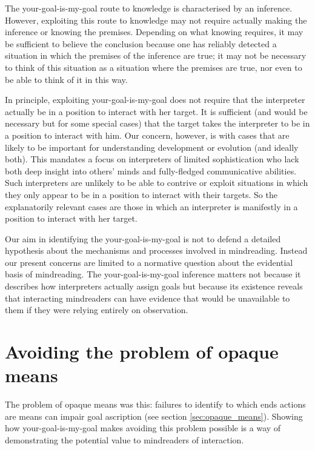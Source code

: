 \documentclass[14pt,a4paper]{extarticle}
\begin{document}
The your-goal-is-my-goal route to knowledge is characterised by an inference.  
However, exploiting this route to knowledge may not require actually making the inference or knowing the premises.  
Depending on what knowing requires,
it may be sufficient to believe the conclusion because one has reliably detected a situation in which the premises of the inference are true;
it may not be necessary to think of this situation as a situation where the premises are true,
nor even to be able to think of it in this way.

In principle,
exploiting your-goal-is-my-goal does not require that the interpreter actually be in a position to interact with her target.
It is sufficient (and would be necessary but for some special cases) that the target takes the interpreter to be in a position to interact with him. 
Our concern, however,
is with cases that are likely to be important for understanding
development or evolution (and ideally both).
This mandates a focus on interpreters of limited sophistication
who lack both deep insight into others' minds and fully-fledged communicative abilities.
Such interpreters are unlikely to be able to contrive or exploit situations in which they only appear to be in a position to interact with their targets.
So the explanatorily relevant cases are those 
in which an interpreter is manifestly in a position to interact with her target.


Our aim in identifying the your-goal-is-my-goal is not to 
defend a detailed hypothesis about the mechanisms and processes involved in mindreading.
Instead our present concerns are limited to a normative question about the evidential basis of mindreading.
The your-goal-is-my-goal inference matters
not because it describes how interpreters actually assign goals
but because 
its existence reveals that interacting mindreaders can have evidence that would be unavailable to them if they were relying   entirely on observation.%
 

\section{Avoiding the problem of opaque means}

The problem of opaque means was this:
 failures to identify to which ends actions are means can impair goal ascription (see section \vref{sec:opaque_means}).
Showing how your-goal-is-my-goal makes  avoiding this problem possible is a way of demonstrating the potential value  to mindreaders of interaction. 
\end{document}
